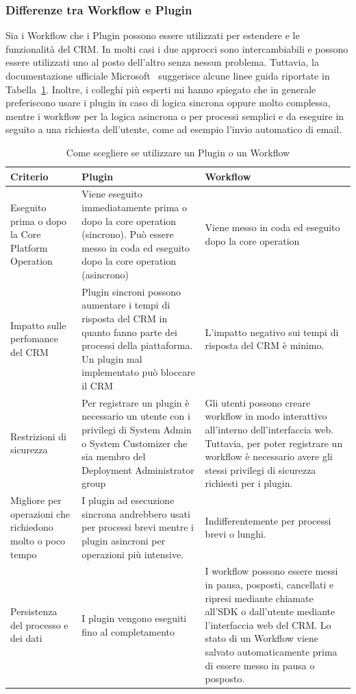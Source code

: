 \subsubsection{Differenze tra Workflow e Plugin}
Sia i Workflow che i Plugin possono essere utilizzati per estendere e le funzionalità del CRM. In molti casi i due approcci sono intercambiabili e possono essere utilizzati uno al posto dell'altro senza nessun problema. 
Tuttavia, la documentazione ufficiale Microsoft~\cite{PluginVSWorkflow} suggerisce alcune linee guida riportate in Tabella~\ref{table:pluginVsWorkflow}. Inoltre, i colleghi più esperti mi hanno spiegato che in generale preferiscono usare i plugin in caso di logica sincrona oppure molto complessa, mentre i workflow per la logica asincrona o per processi semplici e da eseguire in seguito a una richiesta dell'utente, come ad esempio l'invio automatico di email.

\begin{table}[ht]
  \centering
  \begin{tabular}{p{}p{}p{}}
    \toprule
      \textbf{Criterio} & \textbf{Plugin} & \textbf{Workflow} \\
    \midrule
    Eseguito prima o dopo la Core Platform Operation & Viene eseguito immediatamente prima o dopo la core operation (sincrono). Può essere messo in coda ed eseguito dopo la core operation (asincrono) & Viene messo in coda ed eseguito dopo la core operation \\
    \midrule
    Impatto sulle perfomance del CRM & Plugin sincroni possono aumentare i tempi di risposta del CRM in quanto fanno parte dei processi della piattaforma. Un plugin mal implementato può bloccare il CRM & L'impatto negativo sui tempi di risposta del CRM è minimo. \\
    \midrule
    Restrizioni di sicurezza & Per registrare un plugin è necessario un utente con i privilegi di System Admin o System Customizer che sia membro del Deployment Administrator group & Gli utenti possono creare workflow in modo interattivo all'interno dell'interfaccia web. Tuttavia, per poter registrare un workflow è necessario avere gli stessi privilegi di sicurezza richiesti per i plugin. \\
    \midrule
    Migliore per operazioni che richiedono molto o poco tempo & I plugin ad esecuzione sincrona andrebbero usati per processi brevi mentre i plugin asincroni per operazioni più intensive. & Indifferentemente per processi brevi o lunghi. \\
    \midrule
    Persistenza del processo e dei dati & I plugin vengono eseguiti fino al completamento & I workflow possono essere messi in pausa, posposti, cancellati e ripresi mediante chiamate all'SDK o dall'utente mediante l'interfaccia web del CRM. Lo stato di un Workflow viene salvato automaticamente prima di essere messo in pausa o posposto. \\
    \bottomrule
  \end{tabular}
  \caption{Come scegliere se utilizzare un Plugin o un Workflow}
  \label{table:pluginVsWorkflow}
\end{table}

